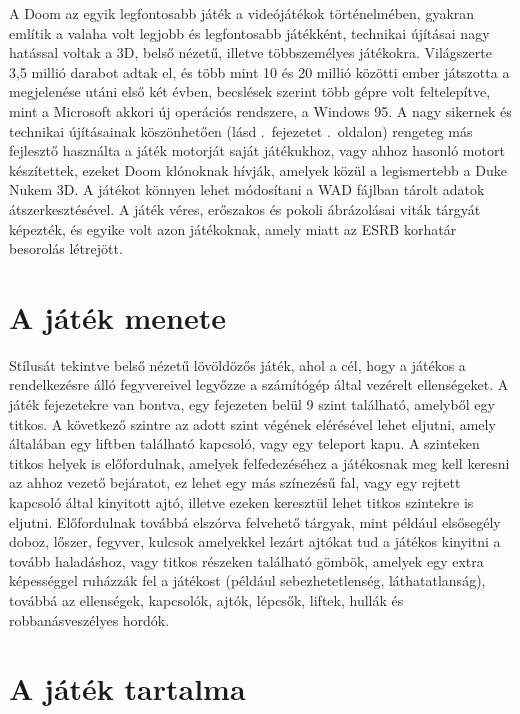 \documentclass{thesis-ekf}
\theoremstyle{definition}
\begin{document}
A Doom az egyik legfontosabb játék a videójátékok történelmében, gyakran említik
a valaha volt legjobb és legfontosabb játékként, technikai újításai nagy
hatással voltak a 3D, belső nézetű, illetve többszemélyes játékokra. Világszerte
3,5 millió darabot adtak el, és több mint 10 és 20 millió közötti ember
játszotta a megjelenése utáni első két évben, becslések szerint több gépre volt
feltelepítve, mint a Microsoft akkori új operációs rendszere, a Windows 95. A
nagy sikernek és technikai újításainak köszönhetően (lásd
.~fejezetet .~oldalon) rengeteg más
fejlesztő használta a játék motorját saját játékukhoz, vagy ahhoz hasonló motort
készítettek, ezeket Doom klónoknak hívják, amelyek közül a legismertebb a Duke
Nukem 3D. A játékot könnyen lehet módosítani a WAD fájlban tárolt adatok
átszerkesztésével. A játék véres, erőszakos és pokoli ábrázolásai viták tárgyát
képezték, és egyike volt azon játékoknak, amely miatt az ESRB korhatár
besorolás létrejött.
\cite[Bevezető]{doomgame}

\section{A játék menete}

Stílusát tekintve belső nézetű lövöldözős játék, ahol a cél, hogy a játékos a
rendelkezésre álló fegyvereivel legyőzze a számítógép által vezérelt
ellenségeket. A játék fejezetekre van bontva, egy fejezeten belül 9 szint
található, amelyből egy titkos. A következő szintre az adott szint végének
elérésével lehet eljutni, amely általában egy liftben található kapcsoló, vagy
egy teleport kapu. A szinteken titkos helyek is előfordulnak, amelyek
felfedezéséhez a játékosnak meg kell keresni az ahhoz vezető bejáratot, ez lehet
egy más színezésű fal, vagy egy rejtett kapcsoló által kinyitott ajtó, illetve
ezeken keresztül lehet titkos szintekre is eljutni. Előfordulnak továbbá
elszórva felvehető tárgyak, mint például elsősegély doboz, lőszer, fegyver,
kulcsok amelyekkel lezárt ajtókat tud a játékos kinyitni a tovább haladáshoz,
vagy titkos részeken található gömbök, amelyek egy extra képességgel ruházzák
fel a játékost (például sebezhetetlenség, láthatatlanság), továbbá az
ellenségek, kapcsolók, ajtók, lépcsők, liftek, hullák és robbanásveszélyes
hordók. \cite[Játékmenet]{doomgame}

\section{A játék tartalma}
\end{document}
